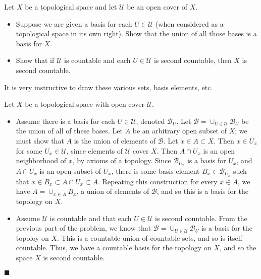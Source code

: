 \documentclass[12pt]{article}
\renewcommand{\qed}{\hfill$\blacksquare$}
\renewenvironment{proof}{\begin{addmargin}[1em]{0em}\begin{newproof}}{\end{newproof}\end{addmargin}\qed}
\newenvironment{problem}[2][Problem]{\begin{trivlist}
\item[\hskip \labelsep {\bfseries #1}\hskip \labelsep {\bfseries #2.}]}{\end{trivlist}}
\begin{document}
\begin{problem}{2-19}
	Let $X$ be a topological space and let $\mathcal{U}$ be an open cover of $X$.
	\begin{itemize}
		\item Suppose we are given a basis for each $U \in \mathcal{U}$ (when considered as a topological space in its own right). Show that the union of all those bases is a basis for $X$.
		\item Show that if $\mathcal{U}$ is countable and each $U\in \mathcal{U}$ is second countable, then $X$ is second countable.
	\end{itemize}
\end{problem}
{\color{red} It is very instructive to draw these various sets, basis elements, etc.} \\
\begin{proof}
Let $X$ be a topological space with open cover $\mathcal{U}$.
\begin{itemize}
	\item Assume there is a basis for each $U \in \mathcal{U}$, denoted $\mathcal{B}_{U}$. Let $\mathcal{B} = \cup_{U\in \mathcal{U}} \mathcal{B}_{U}$ be the union of all of these bases. Let $A$ be an arbitrary open subset of $X$; we must show that $A$ is the union of elements of $\mathcal{B}$. Let $x\in A \subset X$. Then $x\in U_x$ for some $U_x \in \mathcal{U}$, since elements of $\mathcal{U}$ cover $X$. Then $A\cap U_x$ is an open neighborhood of $x$, by axioms of a topology. Since $\mathcal{B}_{U_x}$ is a basis for $U_{x}$, and $A\cap U_x$ is an open subset of $U_x$, there is some basis element $B_x \in \mathcal{B}_{U_x}$ such that $x\in B_x \subset A\cap U_x \subset A$. Repeating this construction for every $x\in A$, we have $A = \cup_{x\in A} B_x$, a union of elements of $\mathcal{B}$, and so this is a basis for the topology on $X$.

	\item Assume $\mathcal{U}$ is countable and that each $U\in \mathcal{U}$ is second countable. From the previous part of the problem, we know that $\mathcal{B}=\cup_{U\in \mathcal{U}} \mathcal{B}_U$ is a basis for the topoloy on $X$. This is a countable union of countable sets, and so is itself countable. Thus, we have a countable basis for the topology on $X$, and so the space $X$ is second countable.
\end{itemize}
\end{proof}
\end{document}
